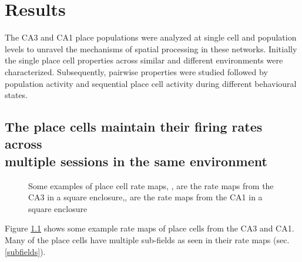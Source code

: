 \chapter{Results}
\label{results}

The CA3 and CA1 place populations were analyzed at single cell and population levels to unravel the mechanisms of spatial processing in these networks. Initially the single place cell properties across similar and different environments were characterized. Subsequently, pairwise properties were studied followed by population activity and sequential place cell activity during different behavioural states. \\ 


\section[Place cell firing in same environment]{The place cells maintain their firing rates across \\ multiple sessions in the same environment}


\begin{figure}[htb!]
\centering
{}
\caption[Rate maps]{Some examples of place cell rate maps, ,  are the rate maps from the CA3 in a square enclosure,,  are the rate maps from the CA1 in a square enclosure}
\label{fig:rm}
\end{figure}
Figure \ref{fig:rm} shows some example rate maps of place cells from the CA3 and CA1. Many of the place cells have multiple sub-fields as seen in their rate maps (sec. \ref{subfields}). 


